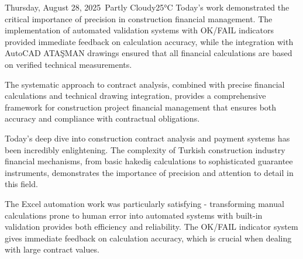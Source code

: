 \begin{dailyentry}{Thursday, August 28, 2025}{\weathercloudy\ Partly Cloudy}{25°C}
Today's work demonstrated the critical importance of precision in construction financial management. The implementation of automated validation systems with OK/FAIL indicators provided immediate feedback on calculation accuracy, while the integration with AutoCAD ATAŞMAN drawings ensured that all financial calculations are based on verified technical measurements.

\begin{center}
\end{center}

The systematic approach to contract analysis, combined with precise financial calculations and technical drawing integration, provides a comprehensive framework for construction project financial management that ensures both accuracy and compliance with contractual obligations.

\begin{dailynotes}
Today's deep dive into construction contract analysis and payment systems has been incredibly enlightening. The complexity of Turkish construction industry financial mechanisms, from basic hakediş calculations to sophisticated guarantee instruments, demonstrates the importance of precision and attention to detail in this field.

The Excel automation work was particularly satisfying - transforming manual calculations prone to human error into automated systems with built-in validation provides both efficiency and reliability. The OK/FAIL indicator system gives immediate feedback on calculation accuracy, which is crucial when dealing with large contract values.


\end{dailynotes}
\end{dailyentry}
